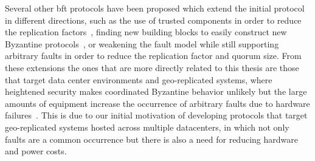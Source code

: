 Several other \acrfull{bft} protocols have been proposed which extend the initial protocol in different directions, such as the use of trusted components in order to reduce the replication factors~\cite{minbft,kapitza2012}, finding new building blocks to easily construct new Byzantine protocols~\cite{Guerraoui2008}, or weakening the fault model while still supporting arbitrary faults in order to reduce the replication factor and quorum size. From these extensions the ones that are more directly related to this thesis are those that target data center environments and geo-replicated systems, where heightened security makes coordinated Byzantine behavior unlikely but the large amounts of equipment increase the occurrence of arbitrary faults due to hardware failures~\cite{Porto2015,Liu2015}. This is due to our initial motivation of developing protocols that target geo-replicated systems hosted across multiple datacenters, in which not only faults are a common occurrence but there is also a need for reducing hardware and power costs.\par
